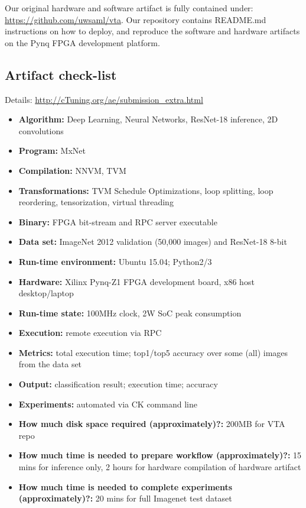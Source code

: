 \documentclass[sigconf]{acmart}
\begin{document}
Our original hardware and software artifact is fully contained under: \url{https://github.com/uwsaml/vta}.
Our repository contains README.md instructions on how to deploy, and reproduce the software and hardware artifacts on the Pynq FPGA development platform.

\subsection{Artifact check-list}

Details: \url{http://cTuning.org/ae/submission_extra.html}

\begin{itemize}
  \item {\bf Algorithm:} Deep Learning, Neural Networks, ResNet-18 inference, 2D convolutions
  \item {\bf Program:} MxNet
  \item {\bf Compilation:} NNVM, TVM
  \item {\bf Transformations:} TVM Schedule Optimizations, loop splitting, loop reordering, tensorization, virtual threading
  \item {\bf Binary:} FPGA bit-stream and RPC server executable
  \item {\bf Data set:} ImageNet 2012 validation (50,000 images) and ResNet-18 8-bit
  \item {\bf Run-time environment:} Ubuntu 15.04; Python2/3
  \item {\bf Hardware:} Xilinx Pynq-Z1 FPGA development board, x86 host desktop/laptop
  \item {\bf Run-time state:} 100MHz clock, 2W SoC peak consumption
  \item {\bf Execution:} remote execution via RPC
  \item {\bf Metrics:} total execution time; top1/top5 accuracy over some (all) images from the data set
  \item {\bf Output:} classification result; execution time; accuracy
  \item {\bf Experiments:} automated via CK command line
  \item {\bf How much disk space required (approximately)?:} 200MB for VTA repo
  \item {\bf How much time is needed to prepare workflow (approximately)?:} 15 mins for inference only, 2 hours for hardware compilation of hardware artifact
  \item {\bf How much time is needed to complete experiments (approximately)?:} 20 mins for full Imagenet test dataset

\end{itemize}
\end{document}

